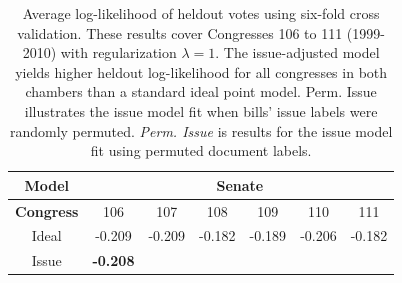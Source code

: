 \label{section:performance}
\begin{table}
  \caption{Average log-likelihood of heldout votes using six-fold cross validation. These results cover Congresses 106 to 111
    (1999-2010) with regularization $\lambda=1$.  The issue-adjusted model yields higher heldout log-likelihood for all congresses in
    both chambers than a standard ideal point model. Perm. Issue illustrates the issue model fit when bills' issue labels were randomly permuted. \emph{Perm. Issue} is results for the issue model fit using permuted document labels.}
 \small
 \center
 \begin{tabular}{|c|cccccc|}
    \hline
    \textbf{Model} & \multicolumn{6}{|c|}{\textbf{Senate}} \\
    \hline
    \textbf{Congress} & \hspace{-4pt} 106 \hspace{-5pt}
    & \hspace{-4pt} 107 \hspace{-5pt}
    & \hspace{-4pt} 108 \hspace{-5pt}
    & \hspace{-4pt} 109 \hspace{-5pt}
    & \hspace{-4pt} 110 \hspace{-5pt}
    & \hspace{-4pt} 111 \hspace{-4pt} \\
    \hline
    Ideal
    & \hspace{-4pt} -0.209 \hspace{-5pt}
    & \hspace{-4pt} -0.209 \hspace{-5pt}
    & \hspace{-4pt} -0.182 \hspace{-5pt}
    & \hspace{-4pt} -0.189 \hspace{-5pt}
    & \hspace{-4pt} -0.206 \hspace{-5pt}
    & \hspace{-4pt} -0.182 \hspace{-4pt} \\
    Issue
    & \hspace{-4pt} \textbf{-0.208} \hspace{-5pt}

\end{tabular}
\end{table}
